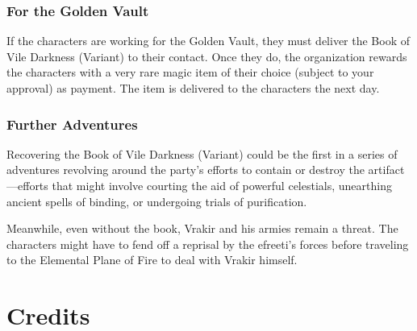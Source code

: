 \documentclass[10pt,a4paper,twoside,bg=print,twocolumn,openany,nodeprecatedcode]{dndbook}
\begin{document}
\subsection{For the Golden Vault}
If the characters are working for the Golden Vault, they must deliver the Book of Vile Darkness (Variant) to their contact. Once they do, the organization rewards the characters with a very rare magic item of their choice (subject to your approval) as payment. The item is delivered to the characters the next day.

\subsection{Further Adventures}
Recovering the Book of Vile Darkness (Variant) could be the first in a series of adventures revolving around the party's efforts to contain or destroy the artifact—efforts that might involve courting the aid of powerful celestials, unearthing ancient spells of binding, or undergoing trials of purification.

Meanwhile, even without the book, Vrakir and his armies remain a threat. The characters might have to fend off a reprisal by the efreeti's forces before traveling to the Elemental Plane of Fire to deal with Vrakir himself.

\chapter{Credits}
\end{document}
